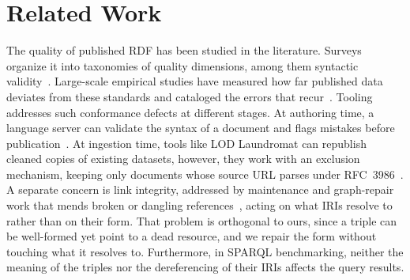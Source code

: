 \section{Related Work}
\label{sec:related_work}

The quality of published \ac{RDF} has been studied in the literature.
Surveys organize it into taxonomies of quality dimensions, among them syntactic validity~\cite{Zaveri2015}.
Large-scale empirical studies have measured how far published data deviates from these standards and cataloged the errors that recur~\cite{Hogan2010WeavingTP,hogan2012empirical}.
Tooling addresses such conformance defects at different stages.
At authoring time, a language server can validate the syntax of a document and flags mistakes before publication~\cite{Vercruysse2025}.
At ingestion time, tools like LOD Laundromat can republish cleaned copies of existing datasets, however, they work with an exclusion mechanism, keeping only documents whose source URL parses under RFC~3986~\cite{ietf3986URI, Beek2014}.
A separate concern is link integrity, addressed by maintenance and graph-repair work that mends broken or dangling references~\cite{regino2021link}, acting on what \acp{IRI} resolve to rather than on their form.
That problem is orthogonal to ours, since a triple can be well-formed yet point to a dead resource, and we repair the form without touching what it resolves to.
Furthermore, in SPARQL benchmarking, neither the meaning of the triples nor the dereferencing of their \acp{IRI} affects the query results.
